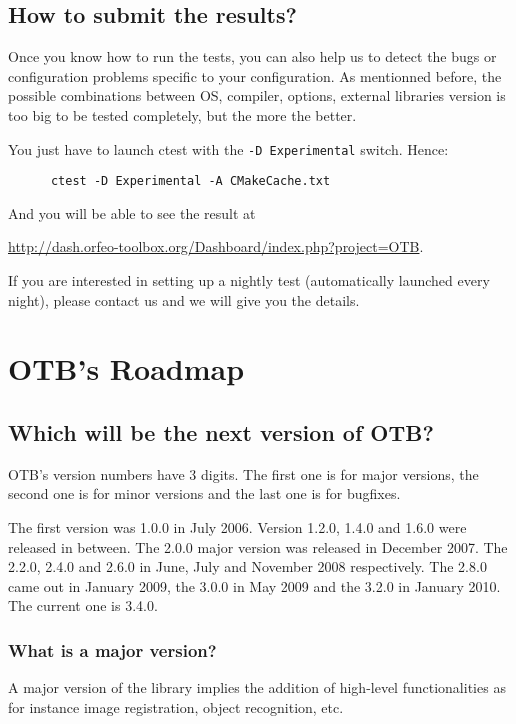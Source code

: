 \subsection{How to submit the results?}

Once you know how to run the tests, you can also help us to detect the bugs or configuration problems specific to your configuration. As mentionned before, the possible combinations between OS, compiler, options, external libraries version is too big to be tested completely, but the more the better.

You just have to launch ctest with the \texttt{-D Experimental} switch. Hence:
\begin{verbatim}
      ctest -D Experimental -A CMakeCache.txt
\end{verbatim}

And you will be able to see the result at

\url{http://dash.orfeo-toolbox.org/Dashboard/index.php?project=OTB}.

If you are interested in setting up a nightly test (automatically launched every night), please contact us and we will give you the details.

\section{OTB's Roadmap}

\subsection{Which will be the next version of OTB?}
OTB's version numbers have 3 digits. The first one is for major
versions, the second one is for minor versions and the last one is for
bugfixes.

The first version was 1.0.0 in July 2006. Version 1.2.0, 1.4.0 and 1.6.0 were
released in between. The 2.0.0 major version  was released in December 2007.
The 2.2.0, 2.4.0 and 2.6.0 in June, July and November 2008 respectively. The
2.8.0 came out in January 2009, the 3.0.0 in May 2009 and the 3.2.0 in January 2010. The current one is 3.4.0.

\subsubsection{What is a major version?}
A major version of the library implies the addition of high-level
functionalities as for instance image registration, object recognition, etc.

